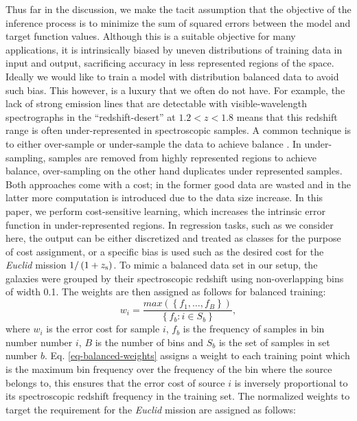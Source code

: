 \documentclass[useAMS,usenatbib,fleqn]{mn2e}
\begin{document}
Thus far in the discussion, we make the tacit assumption that the objective of the inference process is to minimize the sum of squared errors between the model and target function values. Although this is a suitable objective for many applications, it is intrinsically biased by uneven distributions of training data in input and output, sacrificing accuracy in less represented regions of the space. Ideally we would like to train a model with distribution balanced data to avoid such bias. This however, is a luxury that we often do not have. For example, the lack of strong emission lines that are detectable with visible-wavelength spectrographs in the ``redshift-desert'' at $1.2 < z <1.8$ means that this redshift range is often under-represented in spectroscopic samples. A common technique is to either over-sample or under-sample the data to achieve balance \citep{weiss2007}. In under-sampling, samples are removed from highly represented regions to achieve balance, over-sampling on the other hand duplicates under represented samples. Both approaches come with a cost; in the former good data are wasted and in the latter more computation is introduced due to the data size increase. In this paper, we perform cost-sensitive learning, which increases the intrinsic error function in under-represented regions. In regression tasks, such as we consider here, the output can be either discretized and treated as classes for the purpose of cost assignment, or a specific bias is used such as the desired cost for the {\em Euclid} mission $1/\left(1+z_{\rm s}\right)$. To mimic a balanced data set in our setup, the galaxies were grouped by their spectroscopic redshift using non-overlapping bins of width 0.1. The weights are then assigned as follows for balanced training:
\begin{equation}
\label{eq-balanced-weights}
w_{i} = \frac{max\left(\left \{f_{1},\hdots,f_{B}\right\}\right)}{\left\{f_{b}:i\in S_{b}\right\}},
\end{equation}
where $w_{i}$ is the error cost for sample $i$, $f_{b}$ is the frequency of samples in bin number number $i$, $B$ is the number of bins and $S_{b}$ is the set of samples in set number $b$. Eq. \ref{eq-balanced-weights} assigns a weight to each training point which is the maximum bin frequency over the frequency of the bin where the source belongs to, this ensures that the error cost of source $i$ is inversely proportional to its spectroscopic redshift frequency in the training set. The normalized weights to target the requirement for the {\em Euclid} mission are assigned as follows:
\end{document}

